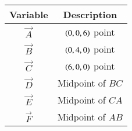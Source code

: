 \begin{tabular}[12pt]{ |c| c|}
    \hline
    \textbf{Variable} & \textbf{Description}\\ 
    \hline
	$\vec{A}$ & $\left(0,0,6\right)$ point\\
    \hline
	$\vec{B}$ & $\left(0,4,0\right)$ point\\
    \hline
	$\vec{C}$ & $\left(6,0,0\right)$ point\\
	\hline
	$\vec{D}$ & Midpoint of $BC$\\
	\hline
	$\vec{E}$ & Midpoint of $CA$\\
    \hline
	$\vec{F}$ & Midpoint of $AB$\\
    \hline
    \end{tabular}
